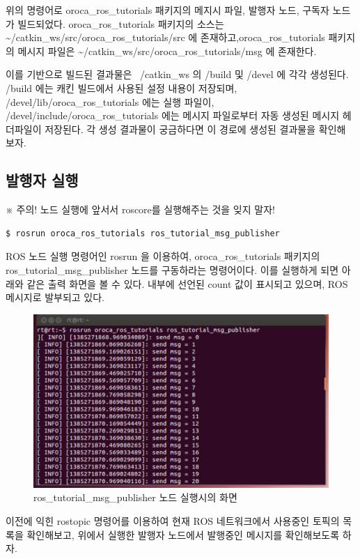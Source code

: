 위의 명령어로 oroca\_ros\_tutorials 패키지의 메지시 파일, 발행자 노드, 구독자 노드가 빌드되었다. 
oroca\_ros\_tutorials 패키지의 소스는 \textasciitilde/catkin\_ws/src/oroca\_ros\_tutorials/src 에 존재하고,oroca\_ros\_tutorials 패키지의 메시지 파일은 \textasciitilde/catkin\_ws/src/oroca\_ros\_tutorials/msg 에 존재한다.

이를 기반으로 빌드된 결과물은 ~/catkin\_ws 의 /build 및 /devel 에 각각 생성된다.
/build 에는 캐킨 빌드에서 사용된 설정 내용이 저장되며, /devel/lib/oroca\_ros\_tutorials 에는 실행 파일이, /devel/include/oroca\_ros\_tutorials 에는 메시지 파일로부터 자동 생성된 메시지 헤더파일이 저장된다. 각 생성 결과물이 궁금하다면 이 경로에 생성된 결과물을 확인해 보자.

\subsection{발행자 실행}

※ 주의! 노드 실행에 앞서서 roscore를 실행해주는 것을 잊지 말자!

\begin{lstlisting}[language=ROS]
$ rosrun oroca_ros_tutorials ros_tutorial_msg_publisher
\end{lstlisting}

ROS 노드 실행 명령어인 rosrun 을 이용하여, oroca\_ros\_tutorials 패키지의 ros\_tutorial\_msg\_publisher 노드를 구동하라는 명령어이다. 이를 실행하게 되면 아래와 같은 출력 화면을 볼 수 있다. 내부에 선언된 count 값이 표시되고 있으며, ROS 메시지로 발부되고 있다. 

\begin{figure}[h]
\centering\includegraphics[width=0.5\columnwidth]{pictures/chapter7/rosrun_ros_tutorial_msg_publisher.png}
\caption{ros\_tutorial\_msg\_publisher 노드 실행시의 화면}
\end{figure}

이전에 익힌 rostopic 명령어를 이용하여 현재 ROS 네트워크에서 사용중인 토픽의 목록을 확인해보고, 위에서 실행한 발행자 노드에서 발행중인 메시지를 확인해보도록 하자.

